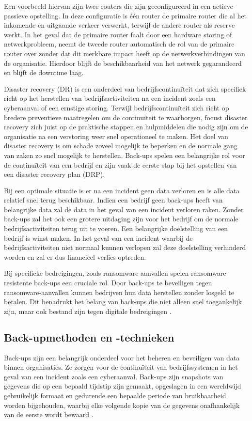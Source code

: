 Een voorbeeld hiervan zijn twee routers die zijn geconfigureerd in een actieve-passieve opstelling. In deze configuratie is één router de primaire router die al het inkomende en uitgaande verkeer verwerkt, terwijl de andere router als reserve werkt. In het geval dat de primaire router faalt door een hardware storing of netwerkprobleem, neemt de tweede router automatisch de rol van de primaire router over zonder dat dit merkbare impact heeft op de netwerkverbindingen van de organisatie. Hierdoor blijft de beschikbaarheid van het netwerk gegarandeerd en blijft de downtime laag. 

Disaster recovery (DR) is een onderdeel van bedrijfscontinuïteit dat zich specifiek richt op het herstellen van bedrijfsactiviteiten na een incident zoals een cyberaanval of een ernstige storing. Terwijl bedrijfscontinuïteit zich richt op bredere preventieve maatregelen om de continuïteit te waarborgen, focust disaster recovery zich juist op de praktische stappen en hulpmiddelen die nodig zijn om de organisatie na een verstoring weer snel operationeel te maken. Het doel van disaster recovery is om schade zoveel mogelijk te beperken en de normale gang van zaken zo snel mogelijk te herstellen. Back-ups spelen een belangrijke rol voor de continuïteit van een bedrijf en zijn vaak de eerste stap bij het opstellen van een disaster recovery plan (DRP). 

Bij een optimale situatie is er na een incident geen data verloren en is alle data relatief snel terug beschikbaar. Indien een bedrijf geen back-ups heeft van belangrijke data zal de data in het geval van een incident verloren raken. Zonder back-ups zal het ook een grotere uitdaging zijn voor het bedrijf om de normale bedrijfsactiviteiten terug uit te voeren. Een belangrijke doelstelling van een bedrijf is winst maken. In het geval van een incident waarbij de bedrijfsactiviteiten niet normaal kunnen verlopen zal deze doelstelling verhinderd worden en zal er dus financieel verlies optreden. 

Bij specifieke bedreigingen, zoals ransomware-aanvallen spelen ransomware-resistente back-ups een cruciale rol. Door back-ups te beveiligen tegen ransomware-aanvallen kunnen bedrijven hun data herstellen zonder losgeld te betalen. Dit benadrukt het belang van back-ups die niet alleen snel toegankelijk zijn, maar ook bestand zijn tegen digitale bedreigingen \autocite{Ghazi2013}.

\subsection{Back-upmethoden en -technieken}
Back-ups zijn een belangrijk onderdeel voor het beheren en beveiligen van data binnen organisaties. Ze zorgen voor de continuïteit van bedrijfssystemen in het geval van een incident zoals een cyberaanval. Back-ups zijn snapshots van gegevens die op een bepaald tijdstip zijn gemaakt, opgeslagen in een wereldwijd gebruikelijk formaat en gedurende een bepaalde periode van bruikbaarheid worden bijgehouden, waarbij elke volgende kopie van de gegevens onafhankelijk van de eerste wordt bewaard \autocite{Nelson2011}. 

